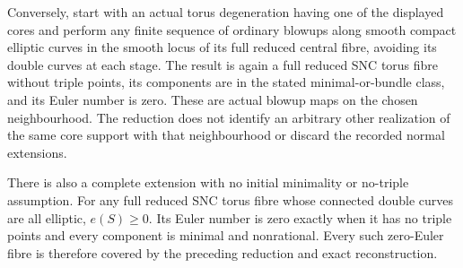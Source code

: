 \begin{proposition}
Conversely, start with an actual torus degeneration having
one of the displayed cores and perform any finite sequence of
ordinary blowups along smooth compact elliptic curves in the
smooth locus of its full reduced central fibre, avoiding its
double curves at each stage. The result is again a full
reduced SNC torus fibre without triple points, its components
are in the stated minimal-or-bundle class, and its Euler
number is zero. These are actual blowup maps on the chosen
neighbourhood. The reduction does not identify an arbitrary
other realization of the same core support with that
neighbourhood or discard the recorded normal extensions.

There is also a complete extension with no initial minimality
or no-triple assumption. For any full reduced SNC torus fibre
whose connected double curves are all elliptic, $e(S)\ge0$.
Its Euler number is zero exactly when it has no triple
points and every component is minimal and nonrational.
Every such zero-Euler fibre is therefore covered by the
preceding reduction and exact reconstruction.
\end{proposition}

